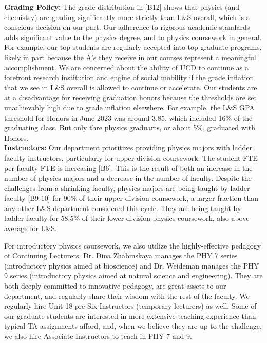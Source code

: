 \documentclass[12pt]{article}
\begin{document}
\noindent
{\bf Grading Policy:} The grade distribution in [B12] shows that
physics (and chemistry) are grading significantly more strictly than
L\&S overall, which is a conscious decision on our part.  Our
adherence to rigorous academic standards adds significant value to the
physics degree, and to physics coursework in general.  For example,
our top students are regularly accepted into top graduate programs,
likely in part because the A's they receive in our courses represent a
meaningful accomplishment.  We are concerned about the ability of UCD
to continue as a forefront research institution and engine of social
mobility if the grade inflation that we see in L\&S overall is allowed
to continue or accelerate.  Our students are at a disadvantage for
receiving graduation honors because the thresholds are set
unachievably high due to grade inflation elsewhere.  For example, the
L\&S GPA threshold for Honors in June 2023 was around 3.85, which
included 16\% of the graduating class.  But only thre physics
graduarts, or about 5\%, graduated with Honors.\\[3pt]

\noindent
{\bf Instructors:} Our department prioritizes providing physics majors
with ladder faculty instructors, particularly for upper-division
coursework.  The student FTE per faculty FTE is increasing [B6].  This
is the result of both an increase in the number of physics majors and
a decrease in the number of faculty.  Despite the challenges from a
shrinking faculty, physics majors are being taught by ladder faculty
[B9-10] for $90\%$ of their upper division coursework, a larger
fraction than any other L\&S department considered this cycle.  They
are being taught by ladder faculty for $58.5\%$ of their
lower-division physics coursework, also above average for L\&S.

For introductory physics coursework, we also utilize the
highly-effective pedagogy of Continuing Lecturers.  Dr. Dina
Zhabinskaya manages the PHY 7 series (introductory physics aimed at
bioscience) and Dr. Weideman manages the PHY 9 series (introductory
physics aimed at natural science and engineering).  They are both
deeply committed to innovative pedagogy, are great assets to our
department, and regularly share their wisdom with the rest of the
faculty.  We regularly hire Unit-18 pre-Six Instructors (temporary
lecturers) as well.  Some of our graduate students are interested in
more extensive teaching experience than typical TA assignments afford,
and, when we believe they are up to the challenge, we also hire
Associate Instructors to teach in PHY 7 and 9.\\[3pt]
\end{document}
